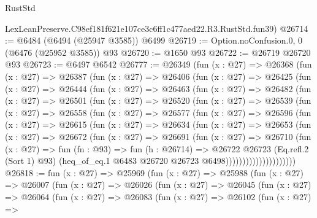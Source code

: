 \begin{lexlean}{RustStd}
\begin{coremodule}
    LexLeanPreserve.C98ef181f621e107ce3c6ff1c477aed22.R3.RustStd.fun39)
@26714 := @6484 (@6494 (@25947 @3585)) @6499
@26719 := Option.noConfusion.{0, 0} (@6476 (@25952 @3585)) @93
@26720 := @1650 @93
@26722 := @26719 @26720 @93
@26723 := @6497 @6542
@26777 := @26349
    (fun (x : @27) =>
    @26368
      (fun (x : @27) =>
      @26387
        (fun (x : @27) =>
        @26406
          (fun (x : @27) =>
          @26425
            (fun (x : @27) =>
            @26444
              (fun (x : @27) =>
              @26463
                (fun (x : @27) =>
                @26482
                  (fun (x : @27) =>
                  @26501
                    (fun (x : @27) =>
                    @26520
                      (fun (x : @27) =>
                      @26539
                        (fun (x : @27) =>
                        @26558
                          (fun (x : @27) =>
                          @26577
                            (fun (x : @27) =>
                            @26596
                              (fun (x : @27) =>
                              @26615
                                (fun (x : @27) =>
                                @26634
                                  (fun (x : @27) =>
                                  @26653
                                    (fun (x : @27) =>
                                    @26672
                                      (fun (x : @27) =>
                                      @26691
                                        (fun (x : @27) =>
                                        @26710
                                          (fun (x : @27) =>
                                          fun (fn : @93) =>
                                          fun (h : @26714) =>
                                          @26722
                                            @26723
                                            (Eq.refl.{2} (Sort 1) @93)
                                            (heq_of_eq.{1}
                                              @6483
                                              @26720
                                              @26723
                                              @6498)))))))))))))))))))))
@26818 := fun (x : @27) =>
  @25969
    (fun (x : @27) =>
    @25988
      (fun (x : @27) =>
      @26007
        (fun (x : @27) =>
        @26026
          (fun (x : @27) =>
          @26045
            (fun (x : @27) =>
            @26064
              (fun (x : @27) =>
              @26083
                (fun (x : @27) =>
                @26102
                  (fun (x : @27) =>

\end{coremodule}
\end{lexlean}
